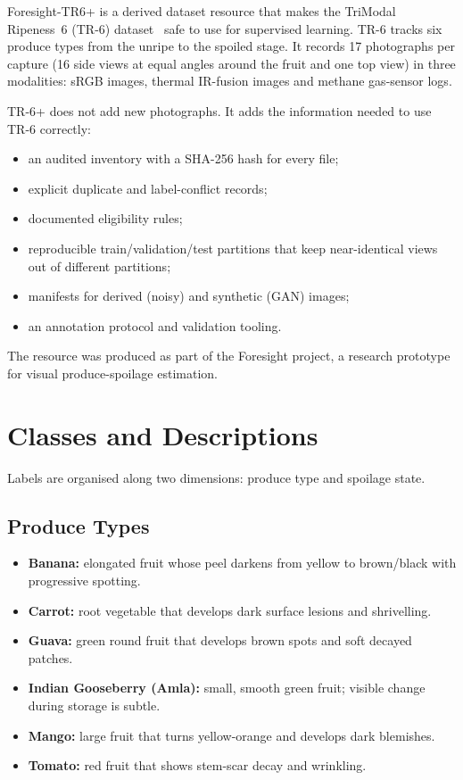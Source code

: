 \documentclass[journal]{IEEEtran}
\begin{document}
Foresight-TR6+ is a derived dataset resource that makes the TriModal Ripeness~6 (TR-6) dataset~\cite{tr6} safe to use for supervised learning. TR-6 tracks six produce types from the unripe to the spoiled stage. It records 17 photographs per capture (16 side views at equal angles around the fruit and one top view) in three modalities: sRGB images, thermal IR-fusion images and methane gas-sensor logs.

TR-6+ does not add new photographs. It adds the information needed to use TR-6 correctly:
\begin{itemize}
  \item an audited inventory with a SHA-256 hash for every file;
  \item explicit duplicate and label-conflict records;
  \item documented eligibility rules;
  \item reproducible train/validation/test partitions that keep near-identical views out of different partitions;
  \item manifests for derived (noisy) and synthetic (GAN) images;
  \item an annotation protocol and validation tooling.
\end{itemize}
The resource was produced as part of the Foresight project, a research prototype for visual produce-spoilage estimation.

\section{Classes and Descriptions}
Labels are organised along two dimensions: produce type and spoilage state.

\subsection{Produce Types}
\begin{itemize}
  \item \textbf{Banana:} elongated fruit whose peel darkens from yellow to brown/black with progressive spotting.
  \item \textbf{Carrot:} root vegetable that develops dark surface lesions and shrivelling.
  \item \textbf{Guava:} green round fruit that develops brown spots and soft decayed patches.
  \item \textbf{Indian Gooseberry (Amla):} small, smooth green fruit; visible change during storage is subtle.
  \item \textbf{Mango:} large fruit that turns yellow-orange and develops dark blemishes.
  \item \textbf{Tomato:} red fruit that shows stem-scar decay and wrinkling.
\end{itemize}
\end{document}
